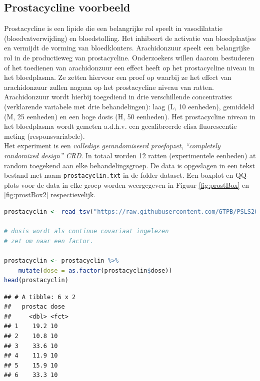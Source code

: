 \documentclass[
  12pt,dutch,coursenotes]{book}
\newcommand{\passthrough}[1]{#1}
\begin{document}
\hypertarget{prostacycline-voorbeeld}{%
\subsection{Prostacycline voorbeeld}\label{prostacycline-voorbeeld}}

Prostacycline is een lipide die een belangrijke rol speelt in vasodilatatie (bloedvatverwijding) en bloedstolling.
Het inhibeert de activatie van bloedplaatjes en vermijdt de vorming van bloedklonters.
Arachidonzuur speelt een belangrijke rol in de productieweg van prostacycline.
Onderzoekers willen daarom bestuderen of het toedienen van arachidonzuur een effect heeft op het prostacycline niveau in het bloedplasma.
Ze zetten hiervoor een proef op waarbij ze het effect van arachidonzuur zullen nagaan op het prostacycline niveau van ratten.
Arachidonzuur wordt hierbij toegediend in drie verschillende concentraties (verklarende variabele met drie behandelingen): laag (L, 10 eenheden), gemiddeld (M, 25 eenheden) en een hoge dosis (H, 50 eenheden).
Het prostacycline niveau in het bloedplasma wordt gemeten a.d.h.v. een gecalibreerde elisa fluorescentie meting (responsvariabele).\\
Het experiment is een \emph{volledige gerandomiseerd proefopzet}, \emph{``completely randomized design'' CRD}. In totaal worden 12 ratten (experimentele eenheden) at random toegekend aan elke behandelingsgroep.
De data is opgeslagen in een tekst bestand met naam \passthrough{\lstinline!prostacyclin.txt!} in de folder dataset.
Een boxplot en QQ-plots voor de data in elke groep worden weergegeven in Figuur \ref{fig:prostBox} en \ref{fig:prostBox2} respectievelijk.

\begin{lstlisting}[language=R]
prostacyclin <- read_tsv("https://raw.githubusercontent.com/GTPB/PSLS20/master/data/prostacyclin.txt")

# dosis wordt als continue covariaat ingelezen
# zet om naar een factor.

prostacyclin <- prostacyclin %>%
    mutate(dose = as.factor(prostacyclin$dose))
head(prostacyclin)
\end{lstlisting}

\begin{lstlisting}
## # A tibble: 6 x 2
##   prostac dose 
##     <dbl> <fct>
## 1    19.2 10   
## 2    10.8 10   
## 3    33.6 10   
## 4    11.9 10   
## 5    15.9 10   
## 6    33.3 10
\end{lstlisting}
\end{document}
